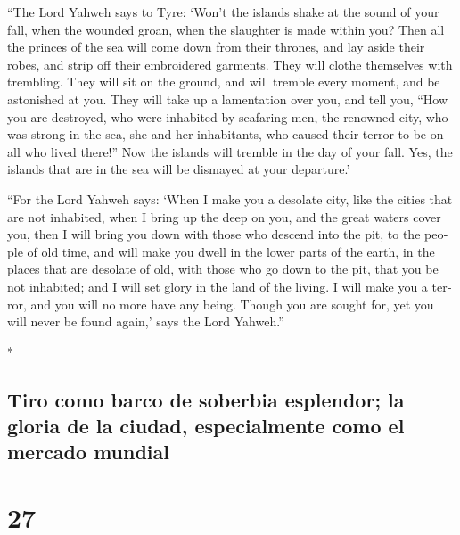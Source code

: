 \begin{paracol}{2}
\begin{otherlanguage}{english}
 ``The Lord Yahweh says to Tyre: `Won't the islands shake
at the sound of your fall, when the wounded groan, when the slaughter is
made within you?  Then all the princes of the sea will
come down from their thrones, and lay aside their robes, and strip off
their embroidered garments. They will clothe themselves with trembling.
They will sit on the ground, and will tremble every moment, and be
astonished at you.  They will take up a lamentation over
you, and tell you, ``How you are destroyed, who were inhabited by
seafaring men, the renowned city, who was strong in the sea, she and her
inhabitants, who caused their terror to be on all who lived there!''
 Now the islands will tremble in the day of your fall.
Yes, the islands that are in the sea will be dismayed at your
departure.'

 ``For the Lord Yahweh says: `When I make you a desolate
city, like the cities that are not inhabited, when I bring up the deep
on you, and the great waters cover you,  then I will
bring you down with those who descend into the pit, to the people of old
time, and will make you dwell in the lower parts of the earth, in the
places that are desolate of old, with those who go down to the pit, that
you be not inhabited; and I will set glory in the land of the living.
 I will make you a terror, and you will no more have any
being. Though you are sought for, yet you will never be found again,'
says the Lord Yahweh.''

\end{otherlanguage}

\switchcolumn[0]*

\hypertarget{tiro-como-barco-de-soberbia-esplendor-la-gloria-de-la-ciudad-especialmente-como-el-mercado-mundial}{%
\subsection{Tiro como barco de soberbia esplendor; la gloria de la
ciudad, especialmente como el mercado
mundial}\label{tiro-como-barco-de-soberbia-esplendor-la-gloria-de-la-ciudad-especialmente-como-el-mercado-mundial}}

\hypertarget{section-52}{%
\section{27}\label{section-52}}


\end{paracol}
